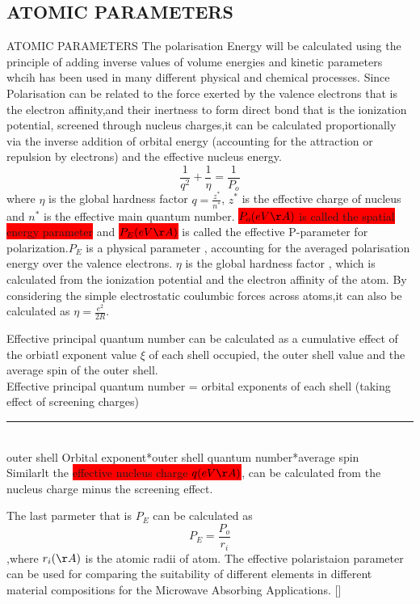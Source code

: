 \documentclass[11pt,aspect ratio=169]{beamer}
\let\oldbib\bibentry
\renewcommand{\bibentry}[1]{{\tiny[\oldbib{#1}]}}
\begin{document}
\subsection{ATOMIC PARAMETERS}
\begin{frame}[t]{ATOMIC PARAMETERS}
	\scriptsize
The polarisation Energy will be calculated using	the principle of adding inverse values of volume energies and kinetic parameters whcih has been used in many different physical and chemical processes.
Since Polarisation can be related to the force exerted by the valence electrons that is the electron affinity,and their inertness to form direct bond that is the ionization potential, screened through nucleus charges,it can be calculated proportionally via the inverse addition of orbital energy (accounting for the attraction or repulsion by electrons) and the effective nucleus energy.
$$\dfrac{1}{{q^2}} + \dfrac{1}{\eta} = \dfrac{1}{P_o}$$
where $\eta$ is the global hardness factor
$q=\frac{z^{*}}{n^{*}}$, $z^{*}$ is the effective charge of nucleus and $n^{*}$ is the effective main quantum number.
\colorbox{red}{$P_o (eV \AA)$ is called the spatial energy parameter} and \colorbox{red}{$P_E(eV \AA)$} is called the effective P-parameter for polarization.$P_E$ is a physical parameter , accounting for the averaged polarisation energy over the valence electrons.
$\eta$ is the global hardness factor , which is calculated from the ionization potential and the electron affinity of the atom. By considering the simple electrostatic coulumbic forces across atoms,it can also be calculated as $\eta=\frac{e^2}{2R}$.
\\


	\end{frame}
\begin{frame}[t]
	Effective principal quantum number can be calculated as a cumulative effect of the orbiatl exponent value $\xi$ of each shell occupied, the outer shell value and the average spin of the outer shell. 
	\\
	Effective principal quantum number    =\hspace{2cm} orbital exponents of each shell (taking effect of screening charges)
	
	\hspace{6cm}\noindent\rule{10cm}{0.4pt}\\
	\hspace{6cm}outer shell Orbital exponent*outer shell quantum number*average spin
	\\
	Similarlt the \colorbox{red}{effective nucleus charge $q (eV \AA)$},  can be calculated from the nucleus charge minus the screening effect.
	
	The last parmeter that is $P_E$ can be calculated as $$P_E = \frac{P_o}{r_i}$$,where $r_i (\AA)$ is the atomic radii of atom.
	The effective polaristaion parameter can be used for comparing the suitability of different elements in different material compositions for the Microwave Absorbing Applications.
	\end{frame}
\end{document}
